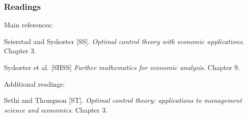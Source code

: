 \documentclass[10pt]{beamer}
\theoremstyle{definition}
\begin{document}
\begin{frame}[fragile]
\frametitle{Readings}
Main references:\bigskip

Seierstad and Syds\ae{}ter [SS]. \emph{Optimal control theory with economic applications}. Chapter 3.

Syds\ae{}ter et al. [SHSS] \emph{Further mathematics for economic analysis}. Chapter 9.\bigskip

Additional readings:

Sethi and Thompson [ST]. \emph{Optimal control theory: applications to management science and economics}. Chapter 3.
\end{frame}
\end{document}
